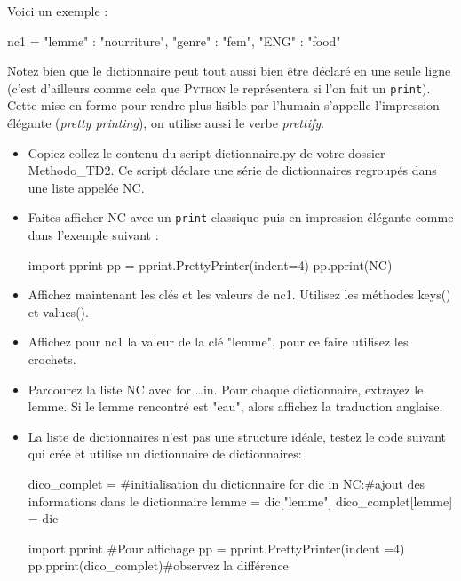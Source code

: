 Voici un exemple :
\begin{python}
nc1 = { "lemme" : "nourriture",
	"genre" : "fem",
	"ENG"   : "food"
      }
\end{python}

Notez bien que le dictionnaire peut tout aussi bien être déclaré en une seule ligne (c'est d'ailleurs comme cela que \textsc{Python} le représentera si l'on fait un \texttt{print}). Cette mise en forme pour rendre plus lisible par l'humain s'appelle l'impression élégante (\textit{pretty printing}), on utilise aussi le verbe \textit{prettify}.

\exer

\begin{itemize}
 \item Copiez-collez le contenu du script dictionnaire.py de votre dossier Methodo\_TD2. Ce script déclare une série de dictionnaires regroupés dans une liste appelée NC.
 \item Faites afficher NC avec un \texttt{print} classique puis en impression élégante comme dans l'exemple suivant :
\begin{python}
import pprint
pp = pprint.PrettyPrinter(indent=4)
pp.pprint(NC)
\end{python}
\item Affichez maintenant les clés et les valeurs de nc1. Utilisez les
méthodes keys() et values().
\item Affichez pour nc1 la valeur de la clé "lemme", pour ce faire utilisez les crochets.
 \item Parcourez la liste NC avec for \dots in. Pour chaque dictionnaire, extrayez le lemme. Si le lemme rencontré est "eau", alors affichez la traduction anglaise.
 \item La liste de dictionnaires n'est pas une structure idéale, testez le code suivant qui crée et utilise un dictionnaire de dictionnaires:
\begin{python}
dico_complet = {}#initialisation du dictionnaire
for dic in NC:#ajout des informations dans le dictionnaire
  lemme = dic["lemme"]
  dico_complet[lemme] = dic

import pprint #Pour affichage
pp = pprint.PrettyPrinter(indent =4)
pp.pprint(dico_complet)#observez la différence


\end{python}
\end{itemize}
